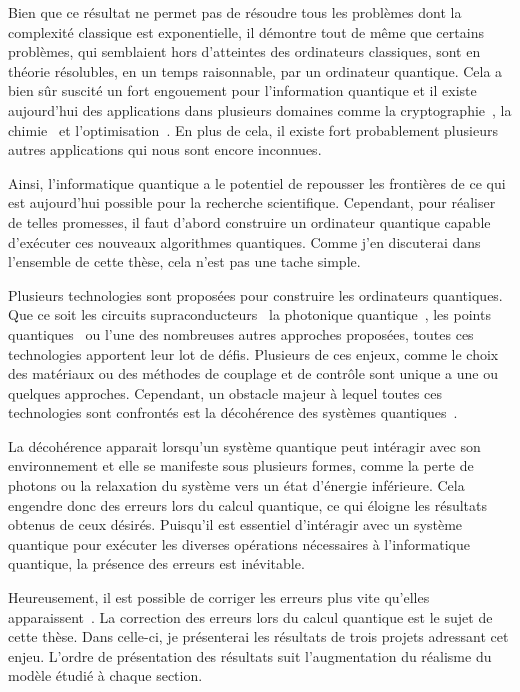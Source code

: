 Bien que ce résultat ne permet pas de résoudre tous les problèmes dont la complexité classique
est exponentielle,
il démontre tout de même que certains problèmes,
qui semblaient hors d'atteintes des ordinateurs classiques,
sont en théorie résolubles, en un temps raisonnable, par un ordinateur quantique.
Cela a bien sûr suscité un fort engouement pour l'information quantique et
il existe aujourd'hui des applications dans plusieurs domaines comme
la cryptographie~\cite{bennett_quantum_2014, gisin_quantum_2002}, 
la chimie~\cite{lanyon_towards_2010, mcardle_quantum_2020, cao_quantum_2019} 
et l'optimisation~\cite{montanaro_quantum_2016, grover_quantum_1997}.
En plus de cela,
il existe fort probablement plusieurs autres applications qui nous sont encore inconnues.

Ainsi,
l'informatique quantique a le potentiel de repousser les frontières de ce qui est aujourd'hui
possible pour la recherche scientifique.
Cependant,
pour réaliser de telles promesses,
il faut d'abord construire un ordinateur quantique capable d'exécuter ces nouveaux algorithmes quantiques.
Comme j'en discuterai dans l'ensemble de cette thèse,
cela n'est pas une tache simple.

Plusieurs technologies sont proposées pour construire les ordinateurs quantiques.
Que ce soit les circuits supraconducteurs~\cite{wallraff_strong_2004, krantz_quantum_2019}
la photonique quantique~\cite{obrien_photonic_2009, kok_linear_2007},
les points quantiques~\cite{pioro-ladriere_electrically_2008, loss_quantum_1998}
ou l'une des nombreuses autres approches proposées,
toutes ces technologies apportent leur lot de défis.
Plusieurs de ces enjeux,
comme le choix des matériaux ou
des méthodes de couplage et de contrôle
sont unique a une ou quelques approches.
Cependant,
un obstacle majeur à lequel toutes ces technologies sont confrontés
est la décohérence des systèmes quantiques~\cite{unruh_maintaining_1995, palma_quantum_1996}.

La décohérence apparait lorsqu'un système quantique peut intéragir avec son environnement
et elle se manifeste sous plusieurs formes, 
comme la perte de photons ou la relaxation du système vers un état d'énergie inférieure.
Cela engendre donc des erreurs lors du calcul quantique,
ce qui éloigne les résultats obtenus de ceux désirés.
Puisqu'il est essentiel d'intéragir avec un système quantique pour exécuter les diverses 
opérations nécessaires à l'informatique quantique,
la présence des erreurs est inévitable.

Heureusement,
il est possible de corriger les erreurs plus vite qu'elles apparaissent~\cite{aharonov_fault-tolerant_1999}.
La correction des erreurs lors du calcul quantique est le sujet de cette thèse.
Dans celle-ci,
je présenterai les résultats de trois projets adressant cet enjeu.
L'ordre de présentation des résultats suit l'augmentation du réalisme du modèle étudié à chaque section.


